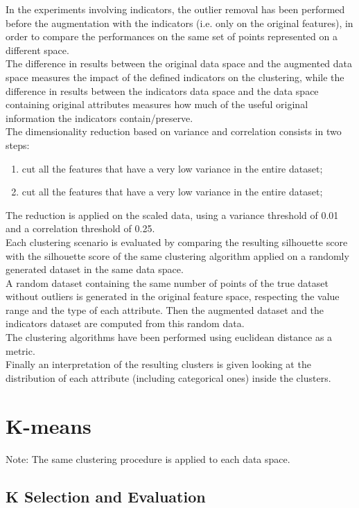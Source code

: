 In the experiments involving indicators, the outlier removal has been performed before the augmentation with the indicators (i.e. only on the original features), in order to compare the performances on the same set of points represented on a different space.\\
The difference in results between the original data space and the augmented data space measures the impact of the defined indicators on the clustering, while the difference in results between the indicators data space and the data space containing original attributes measures how much of the useful original information the indicators contain/preserve.\\
The dimensionality reduction based on variance and correlation consists in two steps:
\begin{enumerate}
    \item cut all the features that have a very low variance in the entire dataset;
    \item cut all the features that have a very low variance in the entire dataset;
\end{enumerate}
The reduction is applied on the scaled data, using a variance threshold of 0.01 and a correlation threshold of 0.25.\\
Each clustering scenario is evaluated by comparing the resulting silhouette score with the silhouette score of the same clustering algorithm applied on a randomly generated dataset in the same data space.\\
A random dataset containing the same number of points of the true dataset without outliers is generated in the original feature space, respecting the value range and the type of each attribute. Then the augmented dataset and the indicators dataset are computed from this random data.\\
The clustering algorithms have been performed using euclidean distance as a metric.\\
Finally an interpretation of the resulting clusters is given looking at the distribution of each attribute (including categorical ones) inside the clusters.

\section{K-means}

Note: The same clustering procedure is applied to each data space.

\subsection{K Selection and Evaluation}

